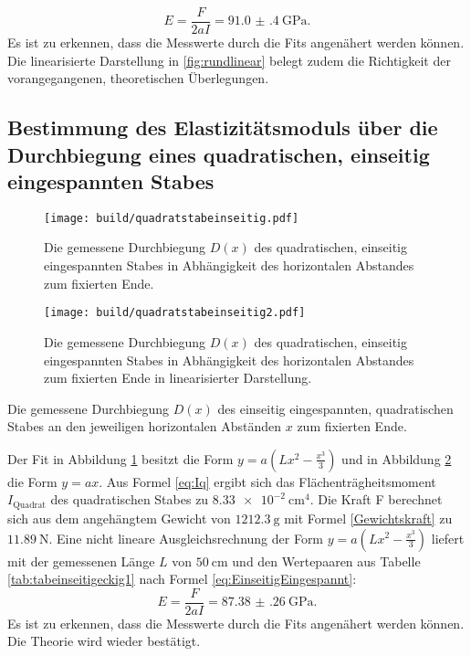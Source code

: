 \begin{displaymath}
	E = \frac{F}{2 a I}= \SI{91.0(4)}{\giga\pascal}\text{.}
\end{displaymath}
Es ist zu erkennen, dass die Messwerte durch die Fits angenähert werden können. Die linearisierte Darstellung in
 \ref{fig:rundlinear} belegt zudem die Richtigkeit der vorangegangenen, theoretischen Überlegungen.



\subsection{Bestimmung des Elastizitätsmoduls über die Durchbiegung eines quadratischen, einseitig eingespannten Stabes}

\begin{figure}
	\centering
	\caption{Die gemessene Durchbiegung $D(x)$ des quadratischen, einseitig eingespannten Stabes
	 in Abhängigkeit des horizontalen Abstandes zum fixierten Ende.}
	\texttt{[image: build/quadratstabeinseitig.pdf]}
	\label{fig:quadratisch}
\end{figure}
\begin{figure}
	\centering
	\caption{Die gemessene Durchbiegung $D(x)$ des quadratischen, einseitig eingespannten Stabes
	 in Abhängigkeit des horizontalen Abstandes zum fixierten Ende in linearisierter Darstellung.}
	\texttt{[image: build/quadratstabeinseitig2.pdf]}
	\label{fig:quadratischlinear}
\end{figure}
\begin{table}
	\caption{Die gemessene Durchbiegung $D(x)$ des einseitig eingespannten, quadratischen Stabes an den jeweiligen horizontalen Abständen $x$ zum fixierten Ende.}
	\begin{minipage}{0.5\textwidth}
		\centering
		
	\end{minipage}
	\begin{minipage}{0.5\textwidth}
		\centering
		
	\end{minipage}
\end{table}
Der Fit in Abbildung \ref{fig:quadratisch} besitzt die Form $y = a ( L x^2 - \frac{x^3}{3} ) $ und in Abbildung \ref{fig:quadratischlinear} die Form $y=a x$. Aus Formel \eqref{eq:Iq} ergibt sich das Flächenträgheitsmoment $I_\text{Quadrat}$ des quadratischen Stabes zu $\SI{8.33e-2}{\centi\meter\tothe{4}}$. Die Kraft F berechnet sich aus dem angehängtem Gewicht von $\SI{1212.3}{\gram}$ mit Formel \eqref{Gewichtskraft} zu $\SI{11.89}{\newton}$. Eine nicht lineare Ausgleichsrechnung der Form $y = a ( L x^2 - \frac{x^3}{3})$ liefert mit der gemessenen Länge $L$ von $\SI{50}{\centi\meter}$ und den Wertepaaren aus Tabelle \ref{tab:tabeinseitigeckig1} nach Formel \eqref{eq:EinseitigEingespannt}:
\begin{displaymath}
E = \frac{F}{2 a I}= \SI{87.38(26)}{\giga\pascal}\text{.}
\end{displaymath}
Es ist zu erkennen, dass die Messwerte durch die Fits angenähert werden können. Die Theorie wird wieder bestätigt.



